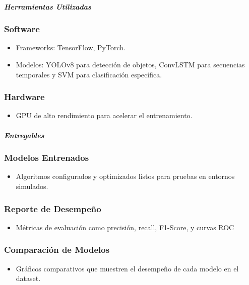 \documentclass[listof=nochaptergap,12pt,times,authoryear]{report}
\begin{document}
\paragraph{\textit{Herramientas Utilizadas}}

\subsubsection{Software}
\begin{itemize}
    \item Frameworks: TensorFlow, PyTorch.
    \item Modelos: YOLOv8 para detección de objetos, ConvLSTM para secuencias temporales y SVM para clasificación específica.
\end{itemize}

\subsubsection{Hardware}
\begin{itemize}
    \item GPU de alto rendimiento para acelerar el entrenamiento.
\end{itemize}

\paragraph{\textit{Entregables}}

\subsubsection{Modelos Entrenados}
\begin{itemize}
    \item Algoritmos configurados y optimizados listos para pruebas en entornos simulados.
\end{itemize}


\subsubsection{Reporte de Desempeño}
\begin{itemize}
    \item Métricas de evaluación como precisión, recall, F1-Score, y curvas ROC
\end{itemize}


\subsubsection{Comparación de Modelos}
\begin{itemize}
    \item Gráficos comparativos que muestren el desempeño de cada modelo en el dataset.
\end{itemize}
\end{document}

